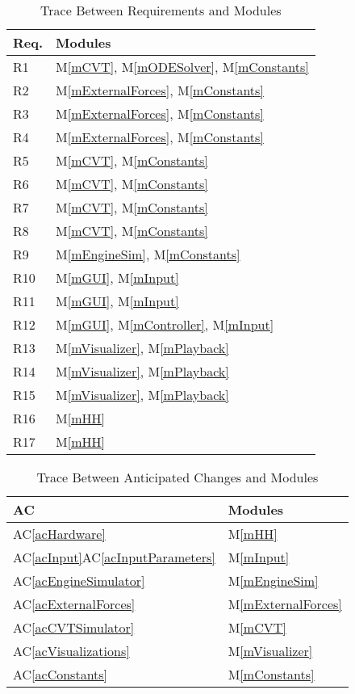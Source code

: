 \documentclass[12pt, titlepage]{article}
\newcommand{\acref}[1]{AC\ref{#1}}
\newcommand{\mref}[1]{M\ref{#1}}
\begin{document}
\begin{table}[H]
\centering
\begin{tabular}{p{} p{}}
\toprule
\textbf{Req.} & \textbf{Modules}\\
\midrule
R1 & \mref{mCVT}, \mref{mODESolver}, \mref{mConstants}\\
R2 & \mref{mExternalForces}, \mref{mConstants}\\
R3 & \mref{mExternalForces}, \mref{mConstants}\\
R4 & \mref{mExternalForces}, \mref{mConstants}\\
R5 & \mref{mCVT}, \mref{mConstants}\\
R6 & \mref{mCVT}, \mref{mConstants}\\
R7 & \mref{mCVT}, \mref{mConstants}\\
R8 & \mref{mCVT}, \mref{mConstants}\\
R9 & \mref{mEngineSim}, \mref{mConstants}\\
R10 & \mref{mGUI}, \mref{mInput}\\
R11 & \mref{mGUI}, \mref{mInput}\\
R12 & \mref{mGUI}, \mref{mController}, \mref{mInput}\\
R13 & \mref{mVisualizer}, \mref{mPlayback}\\
R14 & \mref{mVisualizer}, \mref{mPlayback}\\
R15 & \mref{mVisualizer}, \mref{mPlayback}\\
R16 & \mref{mHH}\\
R17 & \mref{mHH}\\
\bottomrule
\end{tabular}
\caption{Trace Between Requirements and Modules}
\label{TblRT}
\end{table}

\begin{table}[H]
\centering
\begin{tabular}{p{} p{}}
\toprule
\textbf{AC} & \textbf{Modules}\\
\midrule
\acref{acHardware} & \mref{mHH}\\
\acref{acInput}\acref{acInputParameters} & \mref{mInput}\\
\acref{acEngineSimulator} & \mref{mEngineSim}\\
\acref{acExternalForces} & \mref{mExternalForces}\\
\acref{acCVTSimulator} & \mref{mCVT}\\
\acref{acVisualizations} & \mref{mVisualizer}\\
\acref{acConstants} & \mref{mConstants}\\

\bottomrule
\end{tabular}
\caption{Trace Between Anticipated Changes and Modules}
\label{TblACT}
\end{table}
\end{document}
